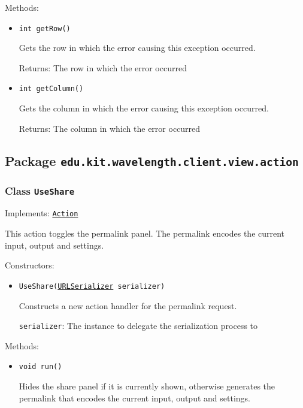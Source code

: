 Methods:
\begin{itemize}
\item \texttt{int getRow()}

Gets the row in which the error causing this exception occurred.

Returns: The row in which the error occurred

\item \texttt{int getColumn()}

Gets the column in which the error causing this exception occurred.

Returns: The column in which the error occurred

\end{itemize}

\subsection{Package \lstinline{edu.kit.wavelength.client.view.action}}
\label{pkg:edu.kit.wavelength.client.view.action}


\subsubsection{Class \texttt{UseShare}}
\label{type:edu.kit.wavelength.client.view.action.UseShare}
Implements: \texttt{\hyperref[type:edu.kit.wavelength.client.view.action.Action]{Action}}

This action toggles the permalink panel. The permalink encodes the current
 input, output and settings.

Constructors:
\begin{itemize}
\item \texttt{UseShare(\hyperref[type:edu.kit.wavelength.client.view.URLSerializer]{URLSerializer} serializer)}

Constructs a new action handler for the permalink request.

\texttt{serializer}: The instance to delegate the serialization process to

\end{itemize}

Methods:
\begin{itemize}
\item \texttt{void run()}

Hides the share panel if it is currently shown, otherwise generates the
 permalink that encodes the current input, output and settings.

\end{itemize}


